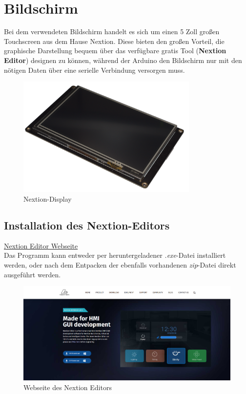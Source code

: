 \section{Bildschirm}
Bei dem verwendeten Bildschirm handelt es sich um einen 5 Zoll großen Touchscreen aus dem Hause Nextion.
Diese bieten den großen Vorteil, die graphische Darstellung bequem über das verfügbare gratis Tool (\textbf{Nextion Editor}) designen zu können, während der Arduino den Bildschirm nur mit den nötigen Daten über eine serielle Verbindung versorgen muss. 

\begin{figure}[h]
    \centering
    \includegraphics[width=0.8\textwidth]{Fotos/Nextion_Display.png}
    \caption{Nextion-Display}
\end{figure}

\newpage
\subsection{Installation des Nextion-Editors}
\href{https://nextion.tech/nextion-editor/}{Nextion Editor Webseite}\\
Das Programm kann entweder per heruntergeladener \textit{.exe}-Datei installiert werden, oder nach dem Entpacken der ebenfalls vorhandenen \textit{zip}-Datei direkt ausgeführt werden.
\begin{figure}[h]
    \centering
    \includegraphics[width=1\textwidth]{bilder/Nextion_Webseite.png}
    \caption{Webseite des Nextion Editors}
\end{figure}

